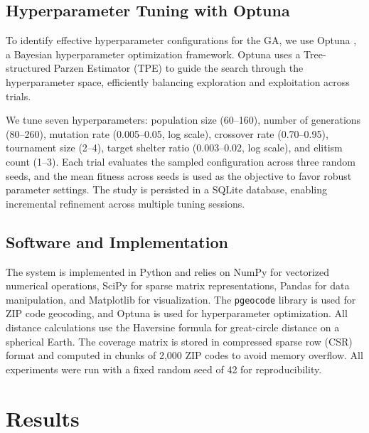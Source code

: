 \documentclass[12pt]{article}
\begin{document}
\subsection{Hyperparameter Tuning with Optuna}

To identify effective hyperparameter configurations for the GA, we use Optuna \cite{optuna2019}, a Bayesian hyperparameter optimization framework. Optuna uses a Tree-structured Parzen Estimator (TPE) to guide the search through the hyperparameter space, efficiently balancing exploration and exploitation across trials.

We tune seven hyperparameters: population size (60--160), number of generations (80--260), mutation rate (0.005--0.05, log scale), crossover rate (0.70--0.95), tournament size (2--4), target shelter ratio (0.003--0.02, log scale), and elitism count (1--3). Each trial evaluates the sampled configuration across three random seeds, and the mean fitness across seeds is used as the objective to favor robust parameter settings. The study is persisted in a SQLite database, enabling incremental refinement across multiple tuning sessions.

\subsection{Software and Implementation}

The system is implemented in Python and relies on NumPy \cite{numpy2020} for vectorized numerical operations, SciPy \cite{scipy2020} for sparse matrix representations, Pandas \cite{pandas2020} for data manipulation, and Matplotlib \cite{matplotlib2007} for visualization. The \texttt{pgeocode} library \cite{pgeocode} is used for ZIP code geocoding, and Optuna \cite{optuna2019} is used for hyperparameter optimization. All distance calculations use the Haversine formula for great-circle distance on a spherical Earth. The coverage matrix is stored in compressed sparse row (CSR) format and computed in chunks of 2,000 ZIP codes to avoid memory overflow. All experiments were run with a fixed random seed of 42 for reproducibility.


\section{Results}
\end{document}
